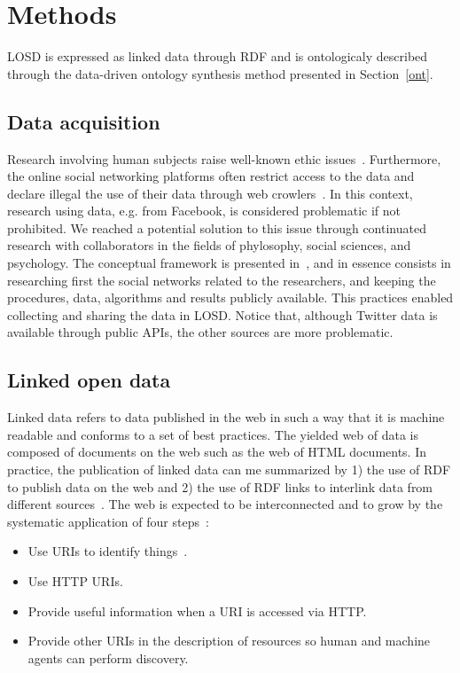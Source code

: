 \documentclass[review]{elsarticle}
\begin{document}

\section{Methods}
LOSD is expressed as linked data through RDF
and is ontologicaly described through the
data-driven ontology synthesis method presented in Section~\ref{ont}.

\subsection{Data acquisition}\label{acq}
Research involving human subjects raise well-known ethic issues~\cite{}.
Furthermore, the online social networking platforms often restrict access
to the data and declare illegal the use of their data through web crowlers~\cite{ile1,ile2}.
In this context, research using data, e.g. from Facebook, is considered
problematic if not prohibited.
We reached a potential solution to this issue through continuated research with
collaborators in the fields of phylosophy, social sciences, and psychology.
The conceptual framework is presented in~\cite{antphy,antphy2}, and in essence
consists in researching first the social networks related to the researchers,
and keeping the procedures, data, algorithms and results publicly available.
This practices enabled collecting and sharing the data in LOSD.
Notice that, although Twitter data is available through public APIs, the other sources are more problematic.


\subsection{Linked open data}
Linked data refers to data published in the web in such a way that it is
machine readable and conforms to a set of best practices.
The yielded web of data is composed of documents on the web
such as the web of HTML documents.
In practice, the publication of linked data can me summarized
by 1) the use of RDF to publish data on the web and 2) the use of RDF
links to interlink data from different sources~\cite{ld1,ld2}.
The web is expected to be interconnected and to grow by the systematic application of four
steps~\cite{lee1}:
\begin{itemize}
    \item Use URIs to identify things~\cite{uri}.
    \item Use HTTP URIs.
    \item Provide useful information when a URI is accessed via HTTP.
    \item Provide other URIs in the description of resources so human
        and machine agents can perform discovery.
\end{itemize}
\end{document}
